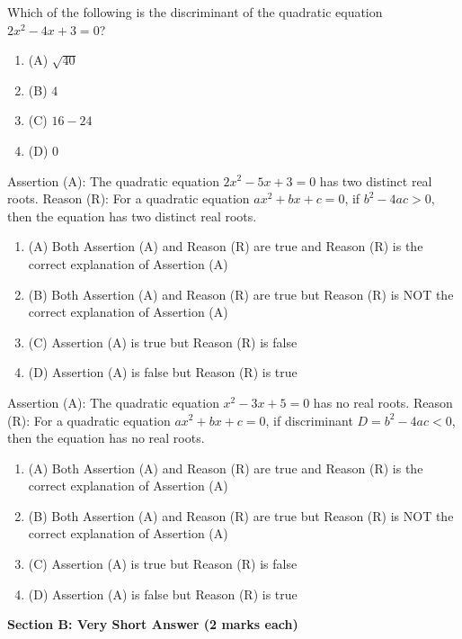 \documentclass[12pt,a4paper]{exam}
\begin{document}
\begin{questions}
\question[1] Which of the following is the discriminant of the quadratic equation $2x^2 - 4x + 3 = 0$?
\begin{enumerate}[label=(\Alph*)]
  \item (A) $\sqrt{40}$
  \item (B) $4$
  \item (C) $16 - 24$
  \item (D) $0$
\end{enumerate}
\vspace{0.15cm}

\question[1] Assertion (A): The quadratic equation $2x^2 - 5x + 3 = 0$ has two distinct real roots.
Reason (R): For a quadratic equation $ax^2 + bx + c = 0$, if $b^2 - 4ac > 0$, then the equation has two distinct real roots.
\begin{enumerate}[label=(\Alph*)]
  \item (A) Both Assertion (A) and Reason (R) are true and Reason (R) is the correct explanation of Assertion (A)
  \item (B) Both Assertion (A) and Reason (R) are true but Reason (R) is NOT the correct explanation of Assertion (A)
  \item (C) Assertion (A) is true but Reason (R) is false
  \item (D) Assertion (A) is false but Reason (R) is true
\end{enumerate}
\vspace{0.15cm}

\question[1] Assertion (A): The quadratic equation $x^2 - 3x + 5 = 0$ has no real roots.
Reason (R): For a quadratic equation $ax^2+bx+c=0$, if discriminant $D = b^2 - 4ac < 0$, then the equation has no real roots.
\begin{enumerate}[label=(\Alph*)]
  \item (A) Both Assertion (A) and Reason (R) are true and Reason (R) is the correct explanation of Assertion (A)
  \item (B) Both Assertion (A) and Reason (R) are true but Reason (R) is NOT the correct explanation of Assertion (A)
  \item (C) Assertion (A) is true but Reason (R) is false
  \item (D) Assertion (A) is false but Reason (R) is true
\end{enumerate}
\vspace{0.15cm}

\end{questions}
\bigskip
\noindent\textbf{\large Section B: Very Short Answer (2 marks each)}
\end{document}
